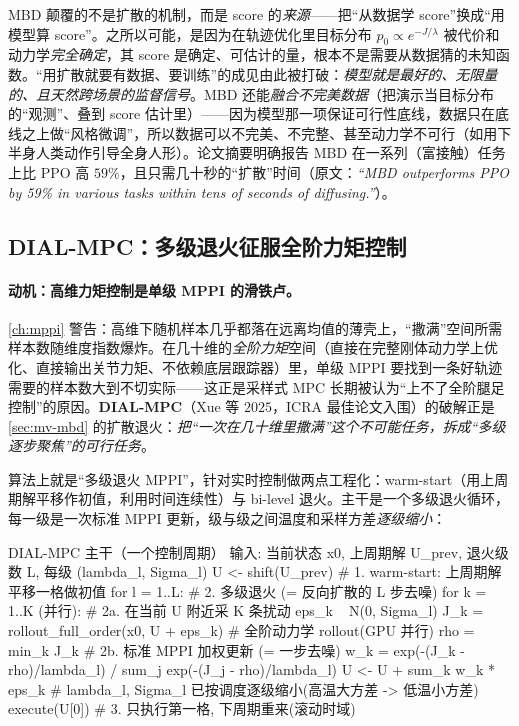 \begin{insight}
MBD 颠覆的不是扩散的机制，而是 score 的\emph{来源}——把“从数据学 score”换成“用模型算 score”。之所以可能，是因为在轨迹优化里目标分布 $p_0\propto e^{-J/\lambda}$ 被代价和动力学\emph{完全确定}，其 score 是确定、可估计的量，根本不是需要从数据猜的未知函数。“用扩散就要有数据、要训练”的成见由此被打破：\emph{模型就是最好的、无限量的、且天然跨场景的监督信号}。MBD 还能\emph{融合不完美数据}（把演示当目标分布的“观测”、叠到 score 估计里）——因为模型那一项保证可行性底线，数据只在底线之上做“风格微调”，所以数据可以不完美、不完整、甚至动力学不可行（如用下半身人类动作引导全身人形）。论文摘要明确报告 MBD 在一系列（富接触）任务上比 PPO 高 $59\%$，且只需几十秒的“扩散”时间\cite{pan2024mbd}（原文：\emph{“MBD outperforms PPO by 59\% in various tasks within tens of seconds of diffusing.”}）。
\end{insight}

\subsection{DIAL-MPC：多级退火征服全阶力矩控制}
\label{sec:mv-dial}

\paragraph{动机：高维力矩控制是单级 MPPI 的滑铁卢。}
\cref{ch:mppi} 警告：高维下随机样本几乎都落在远离均值的薄壳上，“撒满”空间所需样本数随维度指数爆炸。在几十维的\emph{全阶力矩}空间（直接在完整刚体动力学上优化、直接输出关节力矩、不依赖底层跟踪器）里，单级 MPPI 要找到一条好轨迹需要的样本数大到不切实际——这正是采样式 MPC 长期被认为“上不了全阶腿足控制”的原因。\textbf{DIAL-MPC}（Xue 等 $2025$，ICRA 最佳论文入围）的破解正是 \cref{sec:mv-mbd} 的扩散退火：\emph{把“一次在几十维里撒满”这个不可能任务，拆成“多级逐步聚焦”的可行任务}\cite{xue2025dial}。

\begin{algo}\label{alg:mv-dial}
算法上就是“多级退火 MPPI”，针对实时控制做两点工程化：warm-start（用上周期解平移作初值，利用时间连续性）与 bi-level 退火。主干是一个多级退火循环，每一级是一次标准 MPPI 更新，级与级之间温度和采样方差\emph{逐级缩小}：
\end{algo}

\begin{codebox}[text]{DIAL-MPC 主干（一个控制周期）}
输入: 当前状态 x0, 上周期解 U_prev, 退火级数 L, 每级 {(lambda_l, Sigma_l)}
U <- shift(U_prev)                       # 1. warm-start: 上周期解平移一格做初值
for l = 1..L:                            # 2. 多级退火 (= 反向扩散的 L 步去噪)
    for k = 1..K (并行):                 #    2a. 在当前 U 附近采 K 条扰动
        eps_k ~ N(0, Sigma_l)
        J_k = rollout_full_order(x0, U + eps_k)   # 全阶动力学 rollout(GPU 并行)
    rho = min_k J_k                      #    2b. 标准 MPPI 加权更新 (= 一步去噪)
    w_k = exp(-(J_k - rho)/lambda_l) / sum_j exp(-(J_j - rho)/lambda_l)
    U <- U + sum_k w_k * eps_k
    # lambda_l, Sigma_l 已按调度逐级缩小(高温大方差 -> 低温小方差)
execute(U[0])                            # 3. 只执行第一格, 下周期重来(滚动时域)
\end{codebox}

